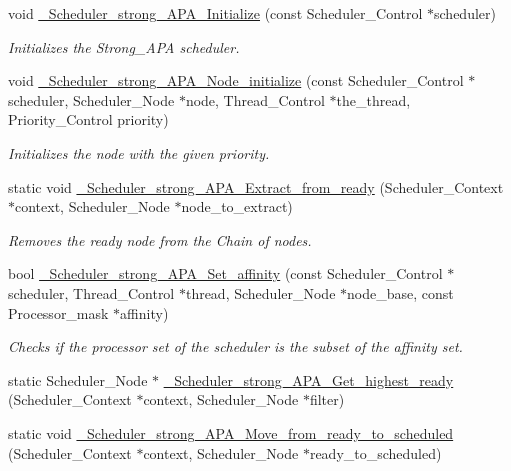 \begin{DoxyCompactItemize}
\item 
void \hyperlink{group__RTEMSScoreSchedulerStrongAPA_gafcd6fde337d7542784698219322b6365}{\+\_\+\+Scheduler\+\_\+strong\+\_\+\+A\+P\+A\+\_\+\+Initialize} (const Scheduler\+\_\+\+Control $\ast$scheduler)
\begin{DoxyCompactList}\small\item\em Initializes the Strong\+\_\+\+A\+PA scheduler. \end{DoxyCompactList}\item 
void \hyperlink{group__RTEMSScoreSchedulerStrongAPA_ga1cde4345d4dc0b5a37a696fa446bb47e}{\+\_\+\+Scheduler\+\_\+strong\+\_\+\+A\+P\+A\+\_\+\+Node\+\_\+initialize} (const Scheduler\+\_\+\+Control $\ast$scheduler, Scheduler\+\_\+\+Node $\ast$node, Thread\+\_\+\+Control $\ast$the\+\_\+thread, Priority\+\_\+\+Control priority)
\begin{DoxyCompactList}\small\item\em Initializes the node with the given priority. \end{DoxyCompactList}\item 
static void \hyperlink{group__RTEMSScoreSchedulerStrongAPA_ga60129e44fa73e5241abc2f5f9f78bb1d}{\+\_\+\+Scheduler\+\_\+strong\+\_\+\+A\+P\+A\+\_\+\+Extract\+\_\+from\+\_\+ready} (Scheduler\+\_\+\+Context $\ast$context, Scheduler\+\_\+\+Node $\ast$node\+\_\+to\+\_\+extract)
\begin{DoxyCompactList}\small\item\em Removes the ready node from the Chain of nodes. \end{DoxyCompactList}\item 
bool \hyperlink{group__RTEMSScoreSchedulerStrongAPA_ga63ef624a9881cf77a2b1eef2c6f05223}{\+\_\+\+Scheduler\+\_\+strong\+\_\+\+A\+P\+A\+\_\+\+Set\+\_\+affinity} (const Scheduler\+\_\+\+Control $\ast$scheduler, Thread\+\_\+\+Control $\ast$thread, Scheduler\+\_\+\+Node $\ast$node\+\_\+base, const Processor\+\_\+mask $\ast$affinity)
\begin{DoxyCompactList}\small\item\em Checks if the processor set of the scheduler is the subset of the affinity set. \end{DoxyCompactList}\item 
static Scheduler\+\_\+\+Node $\ast$ \hyperlink{group__RTEMSScoreSchedulerStrongAPA_gaeca59d69f6f261d5af4b17e73186ed98}{\+\_\+\+Scheduler\+\_\+strong\+\_\+\+A\+P\+A\+\_\+\+Get\+\_\+highest\+\_\+ready} (Scheduler\+\_\+\+Context $\ast$context, Scheduler\+\_\+\+Node $\ast$filter)
\item 
static void \hyperlink{group__RTEMSScoreSchedulerStrongAPA_gaaf649166522c7d7b2e9cca719d61e371}{\+\_\+\+Scheduler\+\_\+strong\+\_\+\+A\+P\+A\+\_\+\+Move\+\_\+from\+\_\+ready\+\_\+to\+\_\+scheduled} (Scheduler\+\_\+\+Context $\ast$context, Scheduler\+\_\+\+Node $\ast$ready\+\_\+to\+\_\+scheduled)
\end{DoxyCompactItemize}


